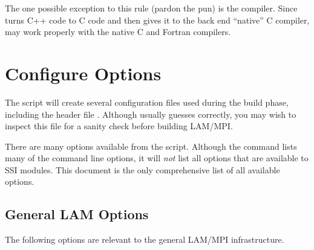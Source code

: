 The one possible exception to this rule (pardon the pun) is the
 compiler.  Since  turns C++ code to C code and then
gives it to the back end ``native'' C compiler,  may work
properly with the native C and Fortran compilers.



\section{Configure Options}
\label{sec:configure:options}

The  script will create several configuration files
used during the build phase, including the header file
.  
%
Although  usually guesses correctly, you may wish to
inspect this file for a sanity check before building LAM/MPI.

There are many options available from the  script.
Although the command  lists many of the
command line options, it will {\em not} list all options that are
available to SSI modules.  This document is the only comprehensive
list of all available options.

\subsection{General LAM Options}
\label{sec:configure:options:general}

The following options are relevant to the general LAM/MPI
infrastructure.

